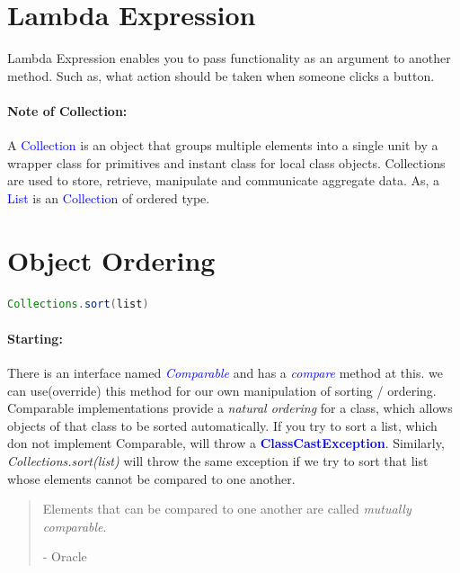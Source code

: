 \documentclass[10 pt]{book}
\begin{document}
\section{Lambda Expression}
Lambda Expression enables you to pass functionality as an argument to another method. Such as, what action should be taken when someone clicks a button.
\paragraph{Note of Collection:}A \textcolor{blue}{Collection} is an object that groups multiple elements into a single unit by a wrapper class for primitives and instant class for local class objects. Collections are used to store, retrieve, manipulate and communicate aggregate data. As, a \textcolor{blue}{List} is an \textcolor{blue}{Collection} of ordered type.

\section{Object Ordering}
\begin{framed}
	\begin{lstlisting}[language = java]
		Collections.sort(list)
	\end{lstlisting}
\end{framed}
\paragraph{Starting:}
\begin{multicols}{2}
There is an interface named \textit{\textcolor{blue}{Comparable}} and has a \textit{\textcolor{blue}{compare}} method at this. we can use(override) this method for our own manipulation of sorting / ordering. \textsf{Comparable} implementations provide a \textit{natural ordering} for a class, which allows objects of that class to be sorted automatically.\linebreak
If you try to sort a list, which don not implement Comparable, will throw a \textbf{\textcolor{blue}{ClassCastException}}. Similarly, \textit{Collections.sort(list)} will throw the same exception if we try to sort that list whose elements cannot be compared to one another.
\end{multicols}
\begin{quotation}
	Elements that can be compared to one another are called \textit{mutually comparable}.
	\begin{flushright}
		- Oracle
	\end{flushright}
\end{quotation}
\end{document}

